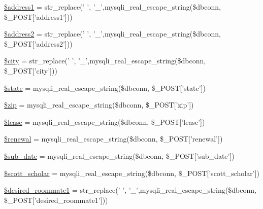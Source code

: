 \begin{DoxyCompactItemize}
\item 
\hyperlink{user__view_2validate_2studentVal_8php_a653579f1800dead9ae026af236859831}{\$address1} = str\-\_\-replace(' ', '\-\_\-',mysqli\-\_\-real\-\_\-escape\-\_\-string(\$dbconn, \$\-\_\-\-P\-O\-S\-T\mbox{[}'address1'\mbox{]}))
\item 
\hyperlink{user__view_2validate_2studentVal_8php_a914305af9ec7e49528f07f35a8e8c6a9}{\$address2} = str\-\_\-replace(' ', '\-\_\-',mysqli\-\_\-real\-\_\-escape\-\_\-string(\$dbconn, \$\-\_\-\-P\-O\-S\-T\mbox{[}'address2'\mbox{]}))
\item 
\hyperlink{user__view_2validate_2studentVal_8php_a5b9ddd3e3a69d8901270064346bdef49}{\$city} = str\-\_\-replace(' ', '\-\_\-',mysqli\-\_\-real\-\_\-escape\-\_\-string(\$dbconn, \$\-\_\-\-P\-O\-S\-T\mbox{[}'city'\mbox{]}))
\item 
\hyperlink{user__view_2validate_2studentVal_8php_ae82306c4f2d17d8dd5c7d8d916b33bed}{\$state} = mysqli\-\_\-real\-\_\-escape\-\_\-string(\$dbconn, \$\-\_\-\-P\-O\-S\-T\mbox{[}'state'\mbox{]})
\item 
\hyperlink{user__view_2validate_2studentVal_8php_aa91be3142812d8cd4221c6f54555079b}{\$zip} = mysqli\-\_\-real\-\_\-escape\-\_\-string(\$dbconn, \$\-\_\-\-P\-O\-S\-T\mbox{[}'zip'\mbox{]})
\item 
\hyperlink{user__view_2validate_2studentVal_8php_ae95126b1133cf958aaf8a31b0283364c}{\$lease} = mysqli\-\_\-real\-\_\-escape\-\_\-string(\$dbconn, \$\-\_\-\-P\-O\-S\-T\mbox{[}'lease'\mbox{]})
\item 
\hyperlink{user__view_2validate_2studentVal_8php_a1a67d224b0f0712693c41c17f2c85183}{\$renewal} = mysqli\-\_\-real\-\_\-escape\-\_\-string(\$dbconn, \$\-\_\-\-P\-O\-S\-T\mbox{[}'renewal'\mbox{]})
\item 
\hyperlink{user__view_2validate_2studentVal_8php_af7a8d782a047ba1d4e89d8d495b1e024}{\$sub\-\_\-date} = mysqli\-\_\-real\-\_\-escape\-\_\-string(\$dbconn, \$\-\_\-\-P\-O\-S\-T\mbox{[}'sub\-\_\-date'\mbox{]})
\item 
\hyperlink{user__view_2validate_2studentVal_8php_aeba3fa7111a05390371249cf7515b517}{\$scott\-\_\-scholar} = mysqli\-\_\-real\-\_\-escape\-\_\-string(\$dbconn, \$\-\_\-\-P\-O\-S\-T\mbox{[}'scott\-\_\-scholar'\mbox{]})
\item 
\hyperlink{user__view_2validate_2studentVal_8php_a9c454efdb922da9127af82e94ee399a1}{\$desired\-\_\-roommate1} = str\-\_\-replace(' ', '\-\_\-',mysqli\-\_\-real\-\_\-escape\-\_\-string(\$dbconn, \$\-\_\-\-P\-O\-S\-T\mbox{[}'desired\-\_\-roommate1'\mbox{]}))
\item 

\end{DoxyCompactItemize}
